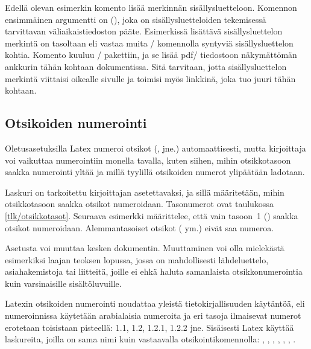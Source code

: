 Edellä olevan esimerkin komento  lisää
merkinnän sisällysluetteloon. Komennon ensimmäinen argumentti on
 (), joka on
sisällysluetteloiden tekemisessä tarvittavan väliaikaistiedoston pääte.
Esimerkissä lisättävä sisällysluettelon merkintä on tasoltaan
 eli vastaa muita \-/ komennolla
syntyviä sisällysluettelon kohtia. Komento 
kuuluu \-/ pakettiin, ja se lisää pdf\-/ tiedostoon
näkymättömän ankkurin tähän kohtaan dokumentissa. Sitä tarvitaan, jotta
sisällysluettelon merkintä viittaisi oikealle sivulle ja toimisi myös
linkkinä, joka tuo juuri tähän kohtaan.

\subsection{Otsikoiden numerointi}
\label{luku/otsikot-numerointi}

Oletusasetuksilla Latex numeroi otsikot (,
 jne.) automaattisesti, mutta kirjoittaja voi vaikuttaa
numerointiin monella tavalla, kuten siihen, mihin otsikkotasoon saakka
numerointi yltää ja millä tyylillä otsikoiden numerot ylipäätään
ladotaan.

Laskuri  on tarkoitettu kirjoittajan
asetettavaksi, ja sillä määritetään, mihin otsikkotasoon saakka otsikot
numeroidaan. Tasonumerot ovat taulukossa \ref{tlk/otsikkotasot}.
Seuraava esimerkki määrittelee, että vain tasoon~1 ()
saakka otsikot numeroidaan. Alemmantasoiset otsikot
( ym.) eivät saa numeroa.

\begin{koodilohkosis}
\setcounter{secnumdepth}{1}
\end{koodilohkosis}

Asetusta voi muuttaa kesken dokumentin. Muuttaminen voi olla mielekästä
esimerkiksi laajan teoksen lopussa, jossa on mahdollisesti
lähdeluettelo, asiahakemistoja tai liitteitä, joille ei ehkä haluta
samanlaista otsikkonumerointia kuin varsinaisille sisältöluvuille.

Latexin otsikoiden numerointi noudattaa yleistä tietokirjallisuuden
käytäntöä, eli numeroinnissa käytetään arabialaisia numeroita ja eri
tasoja ilmaisevat numerot erotetaan toisistaan pisteellä: 1.1, 1.2,
1.2.1, 1.2.2 jne. Sisäisesti Latex käyttää laskureita, joilla on sama
nimi kuin vastaavalla otsikointikomennolla: ,
, , ,
, , .

